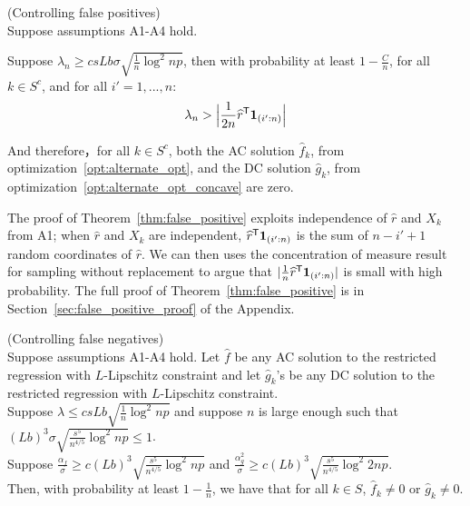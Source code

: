 \begin{theorem} (Controlling false positives) \\
\label{thm:false_positive}
Suppose assumptions A1-A4 hold. 

Suppose $\lambda_n \geq c s Lb \sigma  \sqrt{ \frac{1}{n} \log^2 np}$, then with probability at least $ 1 - \frac{C}{n}$, for all $k \in S^c$, and for all $i'=1,...,n$:
\[
\lambda_n > \Big| \frac{1}{2n}\widehat{r}^{\mathsf{T}} \mbox{\boldmath $1$}_{(i':n)} \Big|
\]

And therefore，for all $k \in S^c$, both the AC solution $\hat{f}_k$, from optimization~\ref{opt:alternate_opt}, and the DC solution $\hat{g}_k$, from optimization~\ref{opt:alternate_opt_concave} are zero. \\
\end{theorem}

The proof of Theorem~\ref{thm:false_positive} exploits independence of
$\hat{r}$ and $X_k$ from A1; when $\hat{r}$ and $X_k$ are independent, $\widehat{r}^{\mathsf{T}} \mbox{\boldmath $1$}_{(i':n)}$ is the sum of $n - i' +1$ random coordinates of $\hat{r}$.  We can then uses the concentration of measure result for sampling without replacement to argue that $| \frac{1}{n} \widehat{r}^{\mathsf{T}}\mbox{\boldmath $1$}_{(i':n)}|$ is small with high probability. The full proof of
Theorem~\ref{thm:false_positive} is in
Section~\ref{sec:false_positive_proof} of the Appendix.

\begin{theorem} (Controlling false negatives) \\
\label{thm:false_negative}
Suppose assumptions A1-A4 hold. Let $\hat{f}$ be any AC solution to the restricted regression with $L$-Lipschitz constraint and let $\hat{g}_k$'s be any DC solution to the restricted regression with $L$-Lipschitz constraint.\\

Suppose $\lambda \leq c sLb  \sqrt{\frac{1}{n} \log^2 np}$ and suppose $n$ is large enough such that $(Lb)^3 \sigma \sqrt{\frac{s^5}{n^{4/5}} \log^2 np} \leq 1$.\\

Suppose 
$\frac{\alpha_f}{\sigma} \geq c (Lb)^3 \sqrt{\frac{s^5}{n^{4/5}} \log^2 np}$ and $\frac{\alpha_g^2}{\sigma} \geq c (Lb)^3 \sqrt{\frac{s^5}{n^{4/5}} \log^2 2np}$.\\

Then, with probability at least $1 - \frac{1}{n}$, we have that for all $k \in S$, $\hat{f}_k \neq 0$ or $\hat{g}_k \neq 0$.

\end{theorem}

